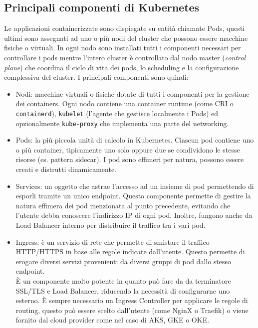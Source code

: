 \documentclass[12pt,a4paper,openright,twoside]{book}
\begin{document}
\subsection{Principali componenti di Kubernetes}
Le applicazioni containerizzate sono dispiegate su entità chiamate Pods, questi ultimi sono assegnati ad uno o più nodi del cluster che possono essere macchine fisiche o virtuali.
In ogni nodo sono installati tutti i componenti necessari per controllare i pods mentre l'intero cluster è controllato dal nodo master (\textit{control plane}) che coordina il ciclo di vita dei pods, lo scheduling e la configurazione complessiva del cluster.
I principali componenti sono quindi:
\begin{itemize}
    \item {
        Nodi: macchine virtuali o fisiche dotate di tutti i componenti per la gestione dei containers. Ogni nodo contiene una container runtime (come CRI o \texttt{containerd}), \texttt{kubelet} (l'agente che gestisce localmente i Pods) ed opzionalmente \texttt{kube-proxy} che implementa una parte del networking.
    }
    \item {
        Pods: la più piccola unità di calcolo in Kubernetes. Ciascun pod contiene uno o più container, tipicamente uno solo oppure due se condividono le stesse risorse (es. pattern sidecar).
        I pod sono effimeri per natura, possono essere creati e distrutti dinamicamente.
    }
    \item {
        Services: un oggetto che astrae l'accesso ad un insieme di pod permettendo di esporli tramite un unico endpoint.
        Questo componente permette di gestire la natura effimera dei pod menzionata al punto precedente, evitando che l'utente debba conoscere l'indirizzo IP di ogni pod.
        Inoltre, fungono anche da Load Balancer interno per distribuire il traffico tra i vari pod.
    }
    \item {
        Ingress: è un servizio di rete che permette di smistare il traffico HTTP/HTTPS in base alle regole indicate dall'utente. Questo permette di erogare diversi servizi provenienti da diversi gruppi di pod dallo stesso endpoint.\\
        È un componente molto potente in quanto può fare da da terminatore SSL/TLS e Load Balancer, riducendo la necessità di configurarne uno esterno.
        È sempre necessario un Ingress Controller per applicare le regole di routing, questo può essere scelto dall'utente (come NginX o Traefik) o viene fornito dal cloud provider come nel caso di AKS, GKE o OKE. 
    }

\end{itemize}
\end{document}
